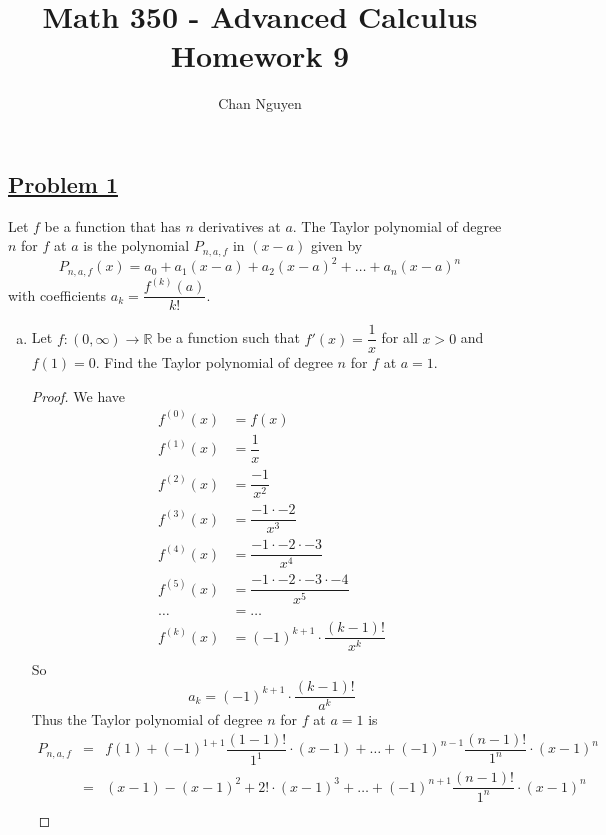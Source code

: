 \documentclass[10pt,letterpaper]{article}
\title{\textbf{Math 350 - Advanced Calculus \\ Homework 9}}
\author{Chan Nguyen}
\begin{document}
\tableofcontents 
\maketitle

\setlength{\parindent}{0pt}
\setlength{\parskip}{1ex}
	\subsection*{{\color{purple}\underline{Problem 1}}}
	Let $f$ be a function that has $n$ derivatives at $a$. The Taylor polynomial of degree $n$
	for $f$ at $a$ is the polynomial $P_{n,a,f}$ in $(x - a)$ given by
	$$P_{n,a,f}(x) = a_0 + a_1(x - a) + a_2(x - a)^2 + \ldots + a_n(x - a)^n$$
	with coefficients $a_k = \dfrac{f^{(k)}(a)}{k!}$.
	\begin{enumerate}[(a)]
	\item Let $f: (0, \infty) \rightarrow \mathbb{R}$ be a function such that $f'(x) = \dfrac{1}{x}$ for all
	$x > 0$ and $f(1) = 0$. Find the Taylor polynomial of degree $n$ for $f$ at $a = 1$.
	\begin{proof}
	We have
	\begin{align*}
		f^{(0)}(x) &= f(x) \\
		f^{(1)}(x) &= \dfrac{1}{x} \\
		f^{(2)}(x) &= \dfrac{-1}{x^2} \\
		f^{(3)}(x) &= \dfrac{-1 \cdot -2}{x^3}\\
		f^{(4)}(x) &= \dfrac{-1 \cdot -2 \cdot -3}{x^4}\\
		f^{(5)}(x) &= \dfrac{-1 \cdot -2 \cdot -3 \cdot -4}{x^5}\\
		\ldots &= \ldots \\
		f^{(k)}(x) &= (-1)^{k+1} \cdot \dfrac{(k - 1)!}{x^{k}}\\
	\end{align*}
	So $$a_k = (-1)^{k+1} \cdot \dfrac{(k-1)!}{a^k}$$
	Thus the Taylor polynomial of degree $n$ for $f$ at $a = 1$ is
	\begin{align*}
	P_{n,a,f} &=& f(1) + 
	(-1)^{1 + 1}\dfrac{(1 - 1)!}{1^1} \cdot (x - 1) + \ldots + 
	(-1)^{n - 1}\dfrac{(n - 1)!}{1^n} \cdot (x - 1)^n \\
	&=& (x - 1) - (x - 1)^2 + 2! \cdot (x - 1)^3 + \ldots + (-1)^{n+1}\dfrac{(n - 1)!}{1^n} \cdot (x - 1)^n\\
	\end{align*}		
	

\end{proof}
\end{enumerate}
\end{document}
